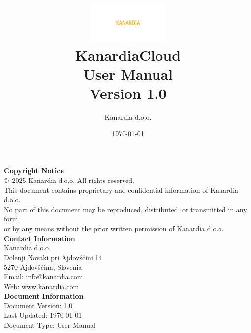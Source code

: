 \documentclass[12pt,a4paper]{book}
\title{
    \vspace{2cm}
    \includegraphics[width=0.3\textwidth]{images/kanardia_logo.png}\\[2cm]
    {\Huge\bfseries KanardiaCloud}\\[0.5cm]
    {\Large User Manual}\\[1cm]
    {\large Version 1.0}
}
\author{Kanardia d.o.o.}
\date{\today}
\begin{document}
\frontmatter
\maketitle

\newpage
\thispagestyle{empty}
\vspace*{\fill}
\begin{center}
\textbf{Copyright Notice}\\[0.5cm]
\copyright\ 2025 Kanardia d.o.o. All rights reserved.\\[0.5cm]
This document contains proprietary and confidential information of Kanardia d.o.o.\\
No part of this document may be reproduced, distributed, or transmitted in any form\\
or by any means without the prior written permission of Kanardia d.o.o.\\[1cm]

\textbf{Contact Information}\\[0.5cm]
Kanardia d.o.o.\\
Dolenji Novaki pri Ajdovščini 14\\
5270 Ajdovščina, Slovenia\\[0.5cm]
Email: info@kanardia.com\\
Web: www.kanardia.com\\[1cm]

\textbf{Document Information}\\[0.5cm]
Document Version: 1.0\\
Last Updated: \today\\
Document Type: User Manual
\end{center}
\vspace*{\fill}

\tableofcontents
\listoffigures
\listoftables

\mainmatter













\appendix



% 
% 
\end{document}
